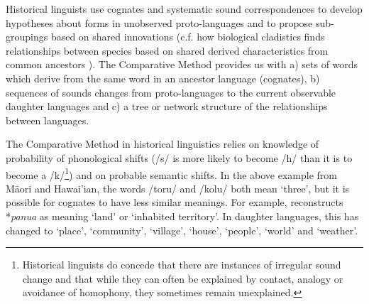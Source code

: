 \documentclass[a4paper,10pt]{article} %
\begin{document}

Historical linguists use cognates and systematic sound correspondences to develop hypotheses about forms in unobserved proto-languages and to propose sub-groupings based on shared innovations (c.f. how biological cladistics finds relationships between species based on shared derived characteristics from common ancestors \citep[16-17]{maclaurin2008biodiversity}). The Comparative Method provides us with a) sets of words which derive from the same word in an ancestor language (cognates), b) sequences of sounds changes from proto-languages to the current observable daughter languages and c) a tree or network structure of the relationships between languages. 
 
The Comparative Method in historical linguistics relies on knowledge of probability of phonological shifts (/s/ is more likely to become /h/ than it is to become a /k/\footnote{Historical linguists do concede that there are instances of irregular sound change \citep{blust1996neogrammarian, campbell1996sound} and that while they can often be explained by contact, analogy or avoidance of homophony, they sometimes remain unexplained.}) and on probable semantic shifts. In the above example from M\={a}ori and Hawai'ian, the words /toru/ and /kolu/ both mean `three', but it is possible for cognates to have less similar meanings. For example, \citet{pawley2005meaning} reconstructs *\emph{panua} as meaning `land' or `inhabited territory'. In daughter languages, this has changed to `place', `community', `village', `house', `people', `world' and `weather'.


\end{document}
